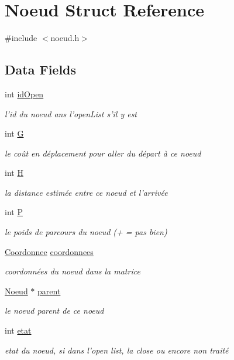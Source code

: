 \hypertarget{struct_noeud}{\section{Noeud Struct Reference}
\label{struct_noeud}
}


{\ttfamily \#include $<$noeud.\-h$>$}

\subsection*{Data Fields}
\begin{DoxyCompactItemize}
\item 
int \hyperlink{struct_noeud_a5b922703f4129d43c1b47bf7781c6d88}{id\-Open}
\begin{DoxyCompactList}\small\item\em l'id du noeud ans l'open\-List s'il y est \end{DoxyCompactList}\item 
int \hyperlink{struct_noeud_ab8735735273b982cc3125e51fe46e2f4}{G}
\begin{DoxyCompactList}\small\item\em le coût en déplacement pour aller du départ à ce noeud \end{DoxyCompactList}\item 
int \hyperlink{struct_noeud_affa487e8e3cc48473cfc05c0ce0165e9}{H}
\begin{DoxyCompactList}\small\item\em la distance estimée entre ce noeud et l'arrivée \end{DoxyCompactList}\item 
int \hyperlink{struct_noeud_aef94be98e2c9e4a4dece75f60ca9792c}{P}
\begin{DoxyCompactList}\small\item\em le poids de parcours du noeud (+ = pas bien) \end{DoxyCompactList}\item 
\hyperlink{struct_coordonnee}{Coordonnee} \hyperlink{struct_noeud_a88d43117c876b9e8d3c1d94d02a82811}{coordonnees}
\begin{DoxyCompactList}\small\item\em coordonnées du noeud dans la matrice \end{DoxyCompactList}\item 
\hyperlink{struct_noeud}{Noeud} $\ast$ \hyperlink{struct_noeud_a55d34286ce81380f1f0e3fc2a782ae52}{parent}
\begin{DoxyCompactList}\small\item\em le noeud parent de ce noeud \end{DoxyCompactList}\item 
int \hyperlink{struct_noeud_a593430af208bfef9b3ce7325558b667b}{etat}
\begin{DoxyCompactList}\small\item\em etat du noeud, si dans l'open list, la close ou encore non traité \end{DoxyCompactList}\end{DoxyCompactItemize}


